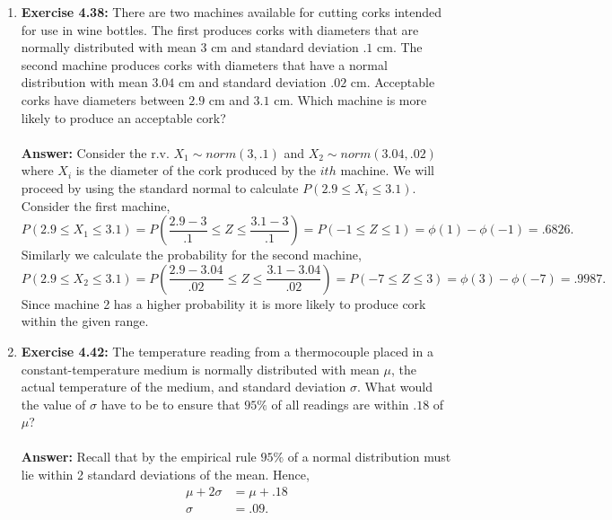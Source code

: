 \documentclass[12pt]{article}
\theoremstyle{homework}
\begin{document}
\begin{enumerate}
\item\hspace{.5in}\textbf{Exercise 4.38:} There are two machines available for cutting corks intended for use in wine bottles. The first produces corks with diameters that are normally distributed with mean 3 cm and standard deviation $.1$ cm. The second machine produces corks with diameters that have a normal distribution with mean $3.04$ cm and standard deviation $.02$ cm. Acceptable corks have diameters between $2.9$ cm and $3.1$ cm. Which machine is more likely to produce an acceptable cork?\\
\\
\textbf{Answer:} Consider the r.v. $X_1 \sim norm(3, .1)$ and  $X_2 \sim norm(3.04, .02)$ where $X_i$ is the diameter of the cork produced by the $ith$ machine. We will proceed by 
using the standard normal to calculate $P(2.9 \le X_i \le 3.1)$. Consider the first machine,
\begin{equation*}
  P(2.9 \le X_1 \le 3.1) = P(\frac{2.9 - 3}{.1} \le Z \le \frac{3.1 - 3}{.1}) = P(-1 \le Z \le 1) = \phi(1) - \phi(-1) = .6826.
\end{equation*} 
Similarly we calculate the probability for the second machine,
\begin{equation*}
  P(2.9 \le X_2 \le 3.1) = P(\frac{2.9 - 3.04}{.02} \le Z \le \frac{3.1 - 3.04}{.02}) = P(-7 \le Z \le 3) = \phi(3) - \phi(-7) = .9987. 
\end{equation*}
Since machine 2 has a higher probability it is more likely to produce cork within the given range.



\vspace{.5in}




\item\hspace{.5in}\textbf{Exercise 4.42:} The temperature reading from a thermocouple placed in a constant-temperature medium is normally distributed with mean $\mu$, the actual temperature of the medium, and standard deviation $\sigma$. What would the value of $\sigma$ have to be to ensure that $95\%$ of all readings are within $.18$ of $\mu$?\\
\\
\textbf{Answer:} Recall that by the empirical rule $95\%$ of a normal distribution must lie within 2 standard deviations of the mean. Hence,
\begin{align*}
  \mu + 2\sigma &= \mu + .18\\
  \sigma &= .09.
\end{align*} 
\vspace{.5in}





\end{enumerate}
\end{document}
